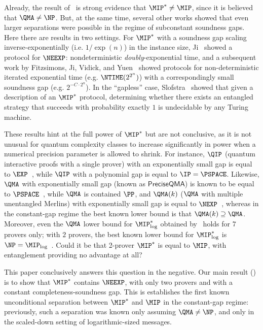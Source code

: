 Already, the result of~\cite{NV18a} is strong evidence that $\MIP^*
\neq \MIP$, since it is believed that $\QMA \neq \NP$. But, at the same
time, several other works showed that even larger separations were
possible in the regime of subconstant soundness gaps. Here there are
results in two settings. For $\MIP^*$ with a soundness gap scaling
inverse-exponentially (i.e. $1/\exp(n)$) in the instance size,
Ji~\cite{Ji17} showed a protocol for $\NEEXP$: nondeterministic
\emph{doubly}-exponential time, and a subsequent work by Fitzsimons,
Ji, Vidick, and Yuen~\cite{FJVY19} showed protocols for
non-deterministic iterated exponential time (e.g. $\NTIME(2^{2^n})$)
with a correspondingly small soundness gap (e.g. $2^{-C \cdot
  2^n}$). In the ``gapless'' case, Slofstra~\cite{Slo16,Slo19} showed that given
a description of an $\MIP^*$ protocol, determining whether there exists an entangled
strategy that succeeds with probability exactly $1$ is undecidable by any Turing machine.

These results hint at the full power of $\MIP^*$ but are not
conclusive, as it is not unusual for quantum complexity classes to
increase significantly in power when a numerical precision parameter
is allowed to shrink. For instance, $\QIP$ (quantum interactive proofs
with a single prover) with an exponentially small
gap is equal to $\EXP$~\cite{IKW12}, while $\QIP$ with a polynomial gap is equal to
$\IP = \PSPACE$. Likewise, $\QMA$ with exponentially small
gap (known as $\mathsf{PreciseQMA}$) is known to be equal to
$\PSPACE$~\cite{FL18}, while $\QMA$ is contained $\PP$, and $\QMA(k)$
($\QMA$ with multiple unentangled Merlins) with exponentially small gap is
equal to $\NEXP$~\cite{Per12}, whereas in the constant-gap
regime the best known lower bound is that
$\QMA(k) \supseteq \QMA$. Moreover, even the $\QMA$ lower bound for
$\MIP^*_{\log}$ obtained by~\cite{NV18b} holds for $7$ provers only;
with $2$ provers, the best known lower bound for $\MIP^*_{\log}$ is
$\NP = \MIP_{\log}$~\cite{NV18a}. Could it be that 2-prover $\MIP^*$ is
equal to $\MIP$, with entanglement providing no advantage at all?

This paper conclusively answers this question in the negative. Our main result () is to show that $\MIP^*$ contains $\NEEXP$, with only
two provers and with a constant completeness-soundness gap. This is
establishes the first known unconditional separation between $\MIP^*$
and $\MIP$ in the constant-gap regime: previously, such a separation
was known only assuming $\QMA \neq \NP$, and only in the scaled-down
setting of logarithmic-sized messages.

